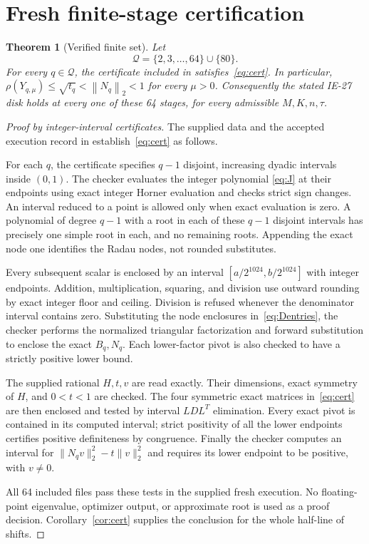 \documentclass[11pt,letterpaper]{article}
\newtheorem{theorem}{Theorem}[section]
\theoremstyle{remark}
\newcommand{\norm}[1]{\left\|#1\right\|_2}
\newcommand{\code}[1]{\texttt{\detokenize{#1}}}
\begin{document}
\section{Fresh finite-stage certification}

\begin{theorem}[Verified finite set]\label{thm:finite}
Let
\[
 \mathcal Q=\{2,3,\ldots,64\}\cup\{80\}.
\]
For every \(q\in\mathcal Q\), the certificate included in
\code{certificates/} satisfies~\eqref{eq:cert}. In particular,
\(\rho(Y_{q,\mu})\le\sqrt{t_q}<\norm{N_q}<1\) for every \(\mu>0\).
Consequently the stated IE-27 disk holds at every one of these 64 stages,
for every admissible \(M,K,n,\tau\).
\end{theorem}
\begin{proof}[Proof by integer-interval certificates]
The supplied data and the accepted execution record in
\code{results/verified.json} establish~\eqref{eq:cert} as follows.

For each \(q\), the certificate specifies \(q-1\) disjoint, increasing dyadic
intervals inside \((0,1)\). The checker evaluates the integer polynomial
\eqref{eq:J} at their endpoints using exact integer Horner evaluation and
checks strict sign changes. An interval reduced to a point is allowed only
when exact evaluation is zero. A polynomial of degree \(q-1\) with a root
in each of these \(q-1\) disjoint intervals has precisely one simple root
in each, and no remaining roots. Appending the exact node one identifies
the Radau nodes, not rounded substitutes.

Every subsequent scalar is enclosed by an interval
\([a/2^{1024},b/2^{1024}]\) with integer endpoints. Addition, multiplication,
squaring, and division use outward rounding by exact integer floor and ceiling.
Division is refused whenever the denominator interval contains zero. Substituting
the node enclosures in~\eqref{eq:Dentries}, the checker performs the normalized
triangular factorization and forward substitution to enclose the exact
\(B_q,N_q\). Each lower-factor pivot is also checked to have a strictly
positive lower bound.

The supplied rational \(H,t,v\) are read exactly. Their dimensions, exact
symmetry of \(H\), and \(0<t<1\) are checked. The four symmetric exact
matrices in~\eqref{eq:cert} are then enclosed and tested by interval
\(LDL^T\) elimination. Every exact pivot is contained in its computed
interval; strict positivity of all the lower endpoints certifies positive
definiteness by congruence. Finally the checker computes an interval for
\(\|N_qv\|_2^2-t\|v\|_2^2\) and requires its lower endpoint to be positive,
with \(v\ne0\).

All 64 included files pass these tests in the supplied fresh execution.
No floating-point eigenvalue, optimizer output, or approximate root is used
as a proof decision. Corollary~\ref{cor:cert} supplies the conclusion for the
whole half-line of shifts.
\end{proof}
\end{document}
